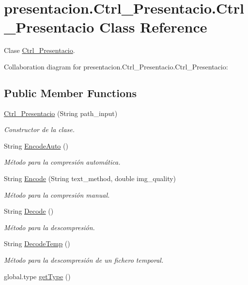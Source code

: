 \hypertarget{classpresentacion_1_1Ctrl__Presentacio_1_1Ctrl__Presentacio}{}\section{presentacion.\+Ctrl\+\_\+\+Presentacio.\+Ctrl\+\_\+\+Presentacio Class Reference}
\label{classpresentacion_1_1Ctrl__Presentacio_1_1Ctrl__Presentacio}


Clase \hyperlink{classpresentacion_1_1Ctrl__Presentacio_1_1Ctrl__Presentacio}{Ctrl\+\_\+\+Presentacio}.  




Collaboration diagram for presentacion.\+Ctrl\+\_\+\+Presentacio.\+Ctrl\+\_\+\+Presentacio\+:
\subsection*{Public Member Functions}
\begin{DoxyCompactItemize}
\item 
\hyperlink{classpresentacion_1_1Ctrl__Presentacio_1_1Ctrl__Presentacio_a3d3ac2a3c4b9fa715bb631fdf3a955dd}{Ctrl\+\_\+\+Presentacio} (String path\+\_\+input)
\begin{DoxyCompactList}\small\item\em Constructor de la clase. \end{DoxyCompactList}\item 
String \hyperlink{classpresentacion_1_1Ctrl__Presentacio_1_1Ctrl__Presentacio_a3c70338349a2890f5191162b22ee78dc}{Encode\+Auto} ()
\begin{DoxyCompactList}\small\item\em Método para la compresión automática. \end{DoxyCompactList}\item 
String \hyperlink{classpresentacion_1_1Ctrl__Presentacio_1_1Ctrl__Presentacio_a83ea715afbbe389c6f1fb68f29121205}{Encode} (String text\+\_\+method, double img\+\_\+quality)
\begin{DoxyCompactList}\small\item\em Método para la compresión manual. \end{DoxyCompactList}\item 
String \hyperlink{classpresentacion_1_1Ctrl__Presentacio_1_1Ctrl__Presentacio_adc652f63ed7619207a94a3a58b6bdd77}{Decode} ()
\begin{DoxyCompactList}\small\item\em Método para la descompresión. \end{DoxyCompactList}\item 
String \hyperlink{classpresentacion_1_1Ctrl__Presentacio_1_1Ctrl__Presentacio_aa9c12bc59a7e9fa0ccd09c0e007d4a4c}{Decode\+Temp} ()
\begin{DoxyCompactList}\small\item\em Método para la descompresión de un fichero temporal. \end{DoxyCompactList}\item 
global.\+type \hyperlink{classpresentacion_1_1Ctrl__Presentacio_1_1Ctrl__Presentacio_a029db5d77bf1e81be0811816a74d81a0}{get\+Type} ()
\end{DoxyCompactItemize}
